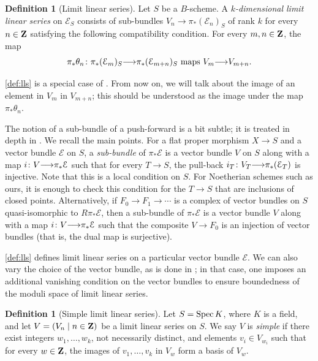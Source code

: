 \documentclass[11pt,reqno]{amsart}
\theoremstyle{plain}
\theoremstyle{definition}
\newtheorem{definition}[theorem]{Definition}
\theoremstyle{remark}
\numberwithin{equation}{section}
\renewcommand{\to}{{\longrightarrow}}
\numberwithin{equation}{section}
\begin{document}
\begin{definition}[Limit linear series]
  \label{def:lls}
  Let $S$ be a $B$-scheme.
  A \emph{$k$-dimensional limit linear series} on $\mathcal E_S$ consists of sub-bundles $V_n \to \pi_* (\mathcal E_n)_S$ of rank $k$ for every $n \in {\bf Z}$ satisfying the following compatibility condition.
  For every $m, n \in {\bf Z}$, the map
  \begin{equation}\label{lls:compatibility}
    \pi_* \theta_n \from \pi_* (\mathcal E_m)_S \to \pi_* (\mathcal E_{m+n})_S \text{ maps } V_m \to V_{m+n}.
  \end{equation}
\end{definition}
\autoref{def:lls} is a special case of \cite[Definition~3.3.2]{oss:14}.
From now on, we will talk about the image of an element in $V_m$ in $V_{m+n}$; this should be understood as the image under the map $\pi_* \theta_n$.

\begin{remark}
The notion of a sub-bundle of a push-forward is a bit subtle; it is treated in depth in \cite[Definition~B.2.1]{oss:14}.
We recall the main points.
For a flat proper morphism $X \to S$ and a vector bundle $\mathcal E$ on $S$, a \emph{sub-bundle} of $\pi_* \mathcal E$ is a vector bundle $V$ on $S$ along with a map $i \from V \to \pi_* \mathcal E$ such that for every $T \to S$, the pull-back $i_T \from V_T \to \pi_* (\mathcal E_T)$ is injective.
Note that this is a local condition on $S$.
For Noetherian schemes such as ours, it is enough to check this condition for the $T \to S$ that are inclusions of closed points.
Alternatively, if $F_0 \to F_1 \to \cdots $ is a complex of vector bundles on $S$ quasi-isomorphic to $R\pi_* \mathcal E$, then a sub-bundle of $\pi_* \mathcal E$ is a vector bundle $V$ along with a map $i \from V \to \pi_* \mathcal E$ such that the composite $V \to F_0$ is an injection of vector bundles (that is, the dual map is surjective).
\end{remark}


\begin{remark}
\autoref{def:lls} defines limit linear series on a particular vector bundle $\mathcal E$.
We can also vary the choice of the vector bundle, as is done in \cite{oss:14}; in that case, one imposes an additional vanishing condition on the vector bundles to ensure boundedness of the moduli space of limit linear series.
\end{remark}


\begin{definition}[Simple limit linear series]
  \label{def:simple_lls}
Let $S = \operatorname{Spec} K$, where $K$ is a field, and let $V = (V_n \mid n \in {\bf Z})$ be a limit linear series on $S$.
We say  $V$ is \emph{simple} if there exist integers $w_1, \dots, w_k$, not necessarily distinct, and elements $v_i \in V_{w_i}$ such that for every $w \in {\bf Z}$, the images of $v_1, \dots, v_k$ in $V_w$ form a basis of $V_w$.
\end{definition}
\end{document}
